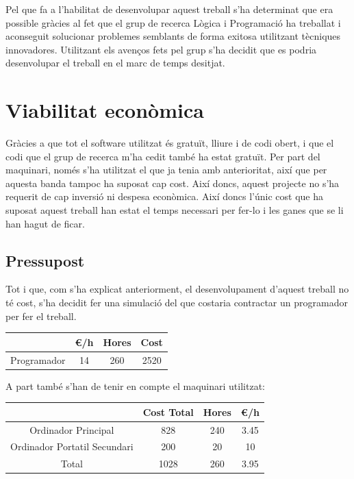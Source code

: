 \documentclass[11pt,a4paper,twoside]{report}
\begin{document}
  Pel que fa a l'habilitat de desenvolupar aquest treball s'ha determinat que era possible gràcies al fet que
  el grup de recerca Lògica i Programació ha treballat i aconseguit solucionar problemes semblants de forma exitosa utilitzant tècniques innovadores. 
  Utilitzant els avenços fets pel grup s'ha decidit que es podria desenvolupar el treball en el marc de temps desitjat.



  \section{Viabilitat econòmica}
  
  Gràcies a que tot el software utilitzat és gratuït, lliure i de codi obert, i que el codi que el grup de recerca m'ha cedit també ha estat gratuït. Per part del maquinari, només s'ha utilitzat el que ja tenia amb anterioritat, així que per aquesta banda tampoc ha suposat cap cost.
  Així doncs, aquest projecte no s'ha requerit de cap inversió ni despesa econòmica. 
  Així doncs l'únic cost que ha suposat aquest treball han estat el temps necessari per fer-lo i les ganes que se li han hagut de ficar. 


  \subsection{Pressupost}
  Tot i que, com s'ha explicat anteriorment, el desenvolupament d'aquest treball no té cost, s'ha decidit fer una simulació del que costaria contractar un programador per fer el treball.
  
  \begin{center}
    \begin{tabular}{|| c | c | c | c||} 
    \hline
     & \euro/h & Hores & Cost \\ [0.5ex] 
    \hline\hline
    Programador & 14 & 260 & 2520 \\ [1ex] 
    \hline
   \end{tabular}
   \end{center}

   A part també s'han de tenir en compte el maquinari utilitzat:
   \begin{center}
    \begin{tabular}{|| c | c | c | c||} 
    \hline
     & Cost Total & Hores & \euro/h \\ [0.5ex] 
    \hline\hline
    Ordinador Principal & 828 & 240 & 3.45 \\ [1ex] 
    Ordinador Portatil Secundari & 200 & 20 & 10 \\ [1ex] 
    \hline\hline
    Total & 1028 & 260 & 3.95 \\


    \hline
   \end{tabular}
   \end{center}
\end{document}
